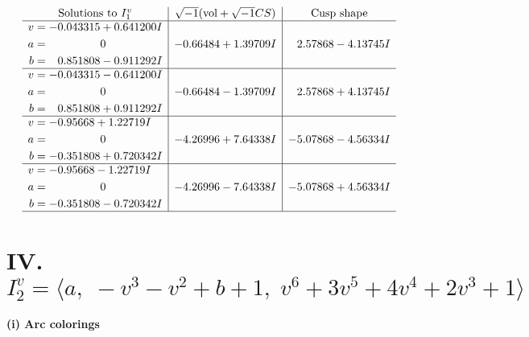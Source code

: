 \documentclass[1p]{elsarticle_modified}
\theoremstyle{definition}
\newcommand{\I}{\sqrt{-1}}
\begin{document}
$$\begin{array}{c|c|c}  
\text{Solutions to }I^v_{1}& \I (\text{vol} + \sqrt{-1}CS) & \text{Cusp shape}\\
 \hline 
\begin{aligned}
v &= -0.043315 + 0.641200 I \\
a &= \phantom{-0.000000 } 0 \\
b &= \phantom{-}0.851808 - 0.911292 I\end{aligned}
 & -0.66484 + 1.39709 I & \phantom{-}2.57868 - 4.13745 I \\ \hline\begin{aligned}
v &= -0.043315 - 0.641200 I \\
a &= \phantom{-0.000000 } 0 \\
b &= \phantom{-}0.851808 + 0.911292 I\end{aligned}
 & -0.66484 - 1.39709 I & \phantom{-}2.57868 + 4.13745 I \\ \hline\begin{aligned}
v &= -0.95668 + 1.22719 I \\
a &= \phantom{-0.000000 } 0 \\
b &= -0.351808 + 0.720342 I\end{aligned}
 & -4.26996 + 7.64338 I & -5.07868 - 4.56334 I \\ \hline\begin{aligned}
v &= -0.95668 - 1.22719 I \\
a &= \phantom{-0.000000 } 0 \\
b &= -0.351808 - 0.720342 I\end{aligned}
 & -4.26996 - 7.64338 I & -5.07868 + 4.56334 I\\
 \hline 
 \end{array}$$\newpage\newpage\renewcommand{\arraystretch}{1}
\centering \section*{IV. $I^v_{2}= \langle a,\;- v^3- v^2+b+1,\;v^6+3 v^5+4 v^4+2 v^3+1 \rangle$}
\flushleft \textbf{(i) Arc colorings}\\
\end{document}

